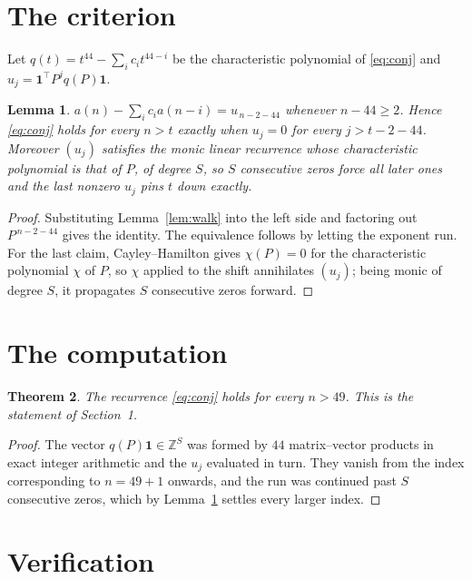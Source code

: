 \documentclass[11pt,a4paper]{article}
\theoremstyle{plain}
\newtheorem{theorem}{Theorem}
\newtheorem{lemma}[theorem]{Lemma}
\theoremstyle{definition}
\begin{document}
\section{The criterion}

Let $q(t)=t^{44}-\sum_i c_i t^{44-i}$ be the characteristic polynomial of
\eqref{eq:conj} and $u_j=\mathbf{1}^{\!\top}P^{j}q(P)\mathbf{1}$.

\begin{lemma}\label{lem:crit}
$a(n)-\sum_i c_i a(n-i)=u_{\,n-2-44}$ whenever $n-44\ge2$. Hence
\eqref{eq:conj} holds for every $n>t$ exactly when $u_j=0$ for every
$j>t-2-44$. Moreover $(u_j)$ satisfies the monic linear recurrence whose
characteristic polynomial is that of $P$, of degree $S$, so $S$ consecutive zeros force all
later ones and the last nonzero $u_j$ pins $t$ down exactly.
\end{lemma}

\begin{proof}
Substituting Lemma~\ref{lem:walk} into the left side and factoring out
$P^{\,n-2-44}$ gives the identity. The equivalence follows by letting the exponent
run. For the last claim, Cayley--Hamilton gives $\chi(P)=0$ for the characteristic
polynomial $\chi$ of $P$, so $\chi$ applied to the shift annihilates $(u_j)$; being monic of
degree $S$, it propagates $S$ consecutive zeros forward.
\end{proof}

\section{The computation}

\begin{theorem}
The recurrence \eqref{eq:conj} holds for every $n>49$. This is the statement of
Section~1.
\end{theorem}

\begin{proof}
The vector $q(P)\mathbf{1}\in\mathbb{Z}^{S}$ was formed by $44$ matrix--vector
products in exact integer arithmetic and the $u_j$ evaluated in turn. They vanish from the
index corresponding to $n=49+1$ onwards, and the run was continued past $S$ consecutive
zeros, which by Lemma~\ref{lem:crit} settles every larger index.
\end{proof}

\section{Verification}
\end{document}
